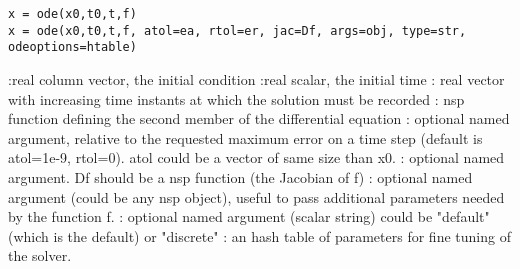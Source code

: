 
\begin{mandesc}
\end{mandesc}

\begin{calling_sequence}
\begin{verbatim}
x = ode(x0,t0,t,f)
x = ode(x0,t0,t,f, atol=ea, rtol=er, jac=Df, args=obj, type=str, odeoptions=htable)
\end{verbatim}
\end{calling_sequence}
\begin{parameters}
  \begin{varlist}
    :real column vector, the initial condition
    :real scalar, the initial time
    : real vector with increasing time instants at which the solution must be recorded
    : nsp function defining the second member of the differential equation
    : optional named argument, relative to the requested maximum error on a time step 
                     (default is atol=1e-9, rtol=0). atol could be a vector of same size than x0.
    : optional named argument. Df should be a nsp function (the Jacobian of f)
    : optional named argument (could be any nsp object), useful to pass additional parameters needed by the function f.
    : optional named argument (scalar string) could be "default" (which is the default) or "discrete"
    : an hash table of parameters for fine tuning of the solver.
  \end{varlist}
\end{parameters}

